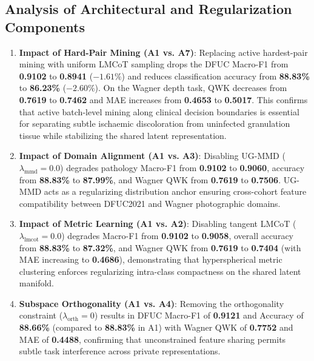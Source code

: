 \documentclass[journal]{IEEEtran}
\begin{document}
\subsection{Analysis of Architectural and Regularization Components}
\begin{enumerate}
    \item \textbf{Impact of Hard-Pair Mining (A1 vs. A7)}: Replacing active hardest-pair mining with uniform LMCoT sampling drops the DFUC Macro-F1 from \textbf{0.9102} to \textbf{0.8941} ($-1.61\%$) and reduces classification accuracy from \textbf{88.83\%} to \textbf{86.23\%} ($-2.60\%$). On the Wagner depth task, QWK decreases from \textbf{0.7619} to \textbf{0.7462} and MAE increases from \textbf{0.4653} to \textbf{0.5017}. This confirms that active batch-level mining along clinical decision boundaries is essential for separating subtle ischaemic discoloration from uninfected granulation tissue while stabilizing the shared latent representation.
    \item \textbf{Impact of Domain Alignment (A1 vs. A3)}: Disabling UG-MMD ($\lambda_{\text{mmd}} = 0.0$) degrades pathology Macro-F1 from \textbf{0.9102} to \textbf{0.9060}, accuracy from \textbf{88.83\%} to \textbf{87.99\%}, and Wagner QWK from \textbf{0.7619} to \textbf{0.7506}. UG-MMD acts as a regularizing distribution anchor ensuring cross-cohort feature compatibility between DFUC2021 and Wagner photographic domains.
    \item \textbf{Impact of Metric Learning (A1 vs. A2)}: Disabling tangent LMCoT ($\lambda_{\text{lmcot}} = 0.0$) degrades Macro-F1 from \textbf{0.9102} to \textbf{0.9058}, overall accuracy from \textbf{88.83\%} to \textbf{87.32\%}, and Wagner QWK from \textbf{0.7619} to \textbf{0.7404} (with MAE increasing to \textbf{0.4686}), demonstrating that hyperspherical metric clustering enforces regularizing intra-class compactness on the shared latent manifold.
    \item \textbf{Subspace Orthogonality (A1 vs. A4)}: Removing the orthogonality constraint ($\lambda_{\text{orth}} = 0$) results in DFUC Macro-F1 of \textbf{0.9121} and Accuracy of \textbf{88.66\%} (compared to \textbf{88.83\%} in A1) with Wagner QWK of \textbf{0.7752} and MAE of \textbf{0.4488}, confirming that unconstrained feature sharing permits subtle task interference across private representations.
\end{enumerate}
\end{document}
